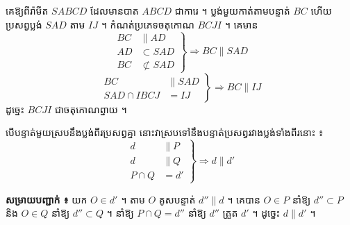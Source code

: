 \begin{example}[លំហាត់គំរូ]
គេឱ្យពីរ៉ាមីត $SABCD$ ដែលមានបាត $ABCD$ ជាការេ ។ ប្លង់មួយកាត់តាមបន្ទាត់ $BC$ ហើយប្រសព្វប្លង់ $SAD$ តាម $IJ$ ។ កំណត់ប្រភេទចតុកោណ $BCJI$ ។
\ans
គេមាន
\[
\left.\begin{aligned} BC &\parallel AD\\ AD &\subset SAD\\ BC &\not\subset SAD \end{aligned}\right\} \Rightarrow BC \parallel SAD
\]
\[
\left.\begin{aligned} BC &\parallel SAD\\ SAD \cap IBCJ &= IJ \end{aligned}\right\} \Rightarrow BC \parallel IJ
\]
ដូច្នេះ $BCJI$ ជាចតុកោណព្នាយ ។
\begin{center}
\end{center}
\end{example}

\begin{theorem}[លក្ខណៈទី ៣]
បើបន្ទាត់មួយស្របនឹងប្លង់ពីរប្រសព្វគ្នា នោះវាស្របទៅនឹងបន្ទាត់ប្រសព្វរវាងប្លង់ទាំងពីរនោះ ៖
\[
\left.\begin{aligned} d &\parallel P\\ d &\parallel Q\\ P \cap Q &= d' \end{aligned}\right\} \Rightarrow d \parallel d'
\]
\end{theorem}
\textbf{សម្រាយបញ្ជាក់ ៖} យក $O \in d'$ ។ តាម $O$ គូសបន្ទាត់ $d'' \parallel d$ ។ គេបាន $O \in P$ នាំឱ្យ $d'' \subset P$ និង $O \in Q$ នាំឱ្យ $d'' \subset Q$ ។ នាំឱ្យ $P \cap Q = d''$ នាំឱ្យ $d''$ ត្រួត $d'$ ។ ដូច្នេះ $d \parallel d'$ ។

